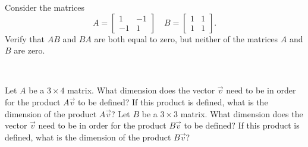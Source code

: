 \begin{exercise}
Consider the matrices
\begin{equation*}
A = \begin{bmatrix} 1 & -1 \\ -1 & 1 \end{bmatrix} \quad B = \begin{bmatrix} 1 & 1 \\ 1 & 1 \end{bmatrix}.
\end{equation*}
Verify that $AB$ and $BA$ are both equal to zero, but neither of the matrices $A$ and $B$ are zero.
\end{exercise}

\begin{exercise}
\
\begin{tasks}
\task Let $A$ be a $3 \times 4$ matrix. What dimension does the vector $\vec{v}$ need to be in order for the product $A\vec{v}$ to be defined? If this product is defined, what is the dimension of the product $A\vec{v}$?
\task Let $B$ be a $3 \times 3$ matrix. What dimension does the vector $\vec{v}$ need to be in order for the product $B\vec{v}$ to be defined? If this product is defined, what is the dimension of the product $B\vec{v}$?
\end{tasks}
\end{exercise}

\setcounter{exercise}{100}

